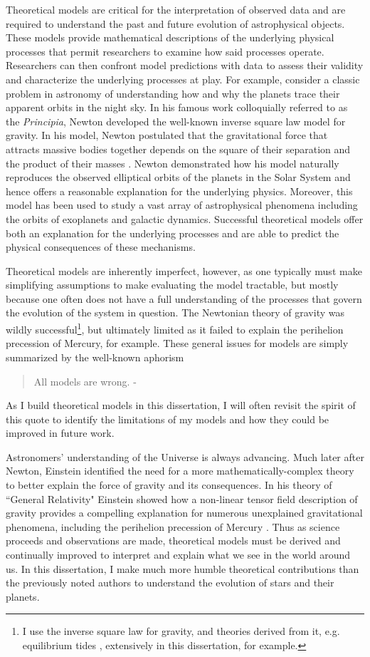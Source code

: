 Theoretical models are critical for the interpretation of observed data and are required to understand the past and future evolution of astrophysical objects. These models provide mathematical descriptions of the underlying physical processes that permit researchers to examine how said processes operate. Researchers can then confront model predictions with data to assess their validity and characterize the underlying processes at play. For example, consider a classic problem in astronomy of understanding how and why the planets trace their apparent orbits in the night sky. In his famous work colloquially referred to as the \textit{Principia}, Newton developed the well-known inverse square law model for gravity. In his model, Newton postulated that the gravitational force that attracts massive bodies together depends on the square of their separation and the product of their masses \citep{Newton1687,Newton1999}. Newton demonstrated how his model naturally reproduces the observed elliptical orbits of the planets in the Solar System and hence offers a reasonable explanation for the underlying physics. Moreover, this model has been used to study a vast array of astrophysical phenomena including the orbits of exoplanets and galactic dynamics. Successful theoretical models offer both an explanation for the underlying processes and are able to predict the physical consequences of these mechanisms.

Theoretical models are inherently imperfect, however, as one typically must make simplifying assumptions to make evaluating the model tractable, but mostly because one often does not have a full understanding of the processes that govern the evolution of the system in question. The Newtonian theory of gravity was wildly successful\footnote{I use the inverse square law for gravity, and theories derived from it, e.g. equilibrium tides \citep{Darwin1880}, extensively in this dissertation, for example.}, but ultimately limited as it failed to explain the perihelion precession of Mercury, for example. These general issues for models are simply summarized by the well-known aphorism
\begin{quote}
All models are wrong. - \citet{Box1976}
\end{quote}
As I build theoretical models in this dissertation, I will often revisit the spirit of this quote to identify the limitations of my models and how they could be improved in future work.

Astronomers' understanding of the Universe is always advancing. Much later after Newton, Einstein identified the need for a more mathematically-complex theory to better explain the force of gravity and its consequences. In his theory of ``General Relativity" Einstein showed how a non-linear tensor field description of gravity provides a compelling explanation for numerous unexplained gravitational phenomena, including the perihelion precession of Mercury \citep{Einstein1915b,Einstein1915a}. Thus as science proceeds and observations are made, theoretical models must be derived and continually improved to interpret and explain what we see in the world around us. In this dissertation, I make much more humble theoretical contributions than the previously noted authors to understand the evolution of stars and their planets. 

